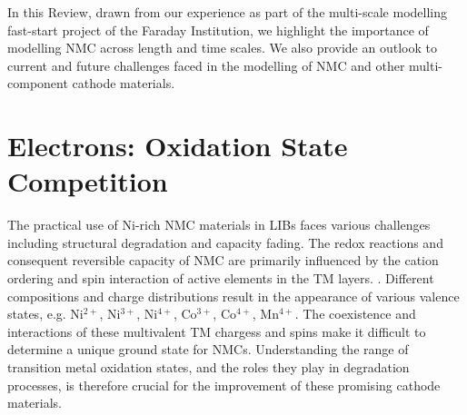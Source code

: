 \documentclass[journal=jacsat,manuscript=article]{achemso}
\begin{document}
In this Review, drawn from our experience as part of the multi-scale modelling fast-start project of the Faraday Institution, we highlight the importance of modelling NMC across length and time scales. We also provide an outlook to current and future challenges faced in the modelling of NMC and other multi-component cathode materials.


\section*{Electrons: Oxidation State Competition}
The practical use of Ni-rich NMC materials in LIBs faces various challenges including structural degradation and capacity fading.  
The redox reactions and consequent reversible capacity of NMC are primarily influenced by the cation ordering and spin interaction of active elements in the TM layers. \cite{Li-acsami-2020,Maleki-aenm.2019,Feng-2019, Xia2018, Xiao_NanoEner2018}. 
Different compositions and charge distributions result in the appearance of various valence states, e.g. Ni$^{2+}$, Ni$^{3+}$, Ni$^{4+}$, Co$^{3+}$, Co$^{4+}$, Mn$^{4+}$. \cite{Xiao_NanoEner2018} 
The coexistence and interactions of these multivalent TM chargess and spins make it difficult to determine a unique ground state for NMCs. \cite{Xiao_NanoEner2018}
Understanding the range of transition metal oxidation states, and the roles they play in degradation processes, is therefore crucial for the improvement of these promising cathode materials.
\end{document}
